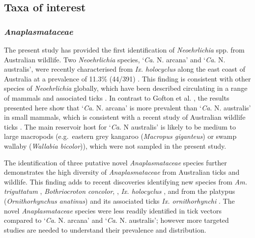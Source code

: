 \documentclass[a4paper, nobind]{templates/ociamthesis}
\begin{document}
\hypertarget{taxa-of-interest-1}{%
\subsection{Taxa of interest}\label{taxa-of-interest-1}}

\hypertarget{anaplasmataceae-3}{%
\subsubsection{\texorpdfstring{\emph{Anaplasmataceae}}{Anaplasmataceae}}\label{anaplasmataceae-3}}

The present study has provided the first identification of \emph{Neoehrlichia} spp. from Australian wildlife. Two \emph{Neoehrlichia} species, `\emph{Ca}. N. arcana' and `\emph{Ca}. N. australis', were recently characterised from \emph{Ix. holocyclus} along the east coast of Australia at a prevalence of 11.3\% (44/391) \autocite{goftonPhylogeneticCharacterisationTwo2016}.
This finding is consistent with other species of \emph{Neoehrlichia} globally, which have been described circulating in a range of mammals and associated ticks \autocite{kawaharaUltrastructurePhylogeneticAnalysis2004,mullerCandidatusNeoehrlichiaChilensis2018}.
In contrast to Gofton et al. \autocite*{goftonPhylogeneticCharacterisationTwo2016}, the results presented here show that `\emph{Ca}. N. arcana' is more prevalent than `\emph{Ca}. N. australis' in small mammals, which is consistent with a recent study of Australian wildlife ticks \autocite{eganBacterialCommunityProfiling2020}.
The main reservoir host for `\emph{Ca}. N australis' is likely to be medium to large macropods (e.g.~eastern grey kangaroo (\emph{Macropus giganteus}) or swamp wallaby (\emph{Wallabia bicolor})), which were not sampled in the present study.

The identification of three putative novel \emph{Anaplasmataceae} species further demonstrates the high diversity of \emph{Anaplasmataceae} from Australian ticks and wildlife.
This finding adds to recent discoveries identifying new species from \emph{Am. triguttatum} \autocite{goftonDetectionPhylogeneticCharacterisation2017}, \emph{Bothriocroton concolor}, \autocite{lohIdentificationCharacterisationMicroorganisms2018}, \emph{Ix. holocyclus} \autocite{goftonPhylogeneticCharacterisationTwo2016}, and from the platypus (\emph{Ornithorhynchus anatinus}) and its associated ticks \emph{Ix. ornithorhynchi} \autocite{goftonNovelEhrlichiaSpecies2018}.
The novel \emph{Anaplasmataceae} species were less readily identified in tick vectors compared to `\emph{Ca}. N. arcana' and `\emph{Ca}. N. australis'; however more targeted studies are needed to understand their prevalence and distribution.
\end{document}
